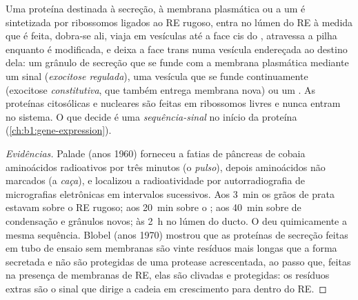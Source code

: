 \begin{proposition}\label{prop:b1:eukaryotic-cell:secretory}
Uma proteína destinada à secreção, à membrana plasmática ou a um
 é sintetizada por ribossomos ligados ao RE rugoso, entra no
lúmen do RE à medida que é feita, dobra-se ali, viaja em vesículas até a
face cis do , atravessa a pilha enquanto é modificada, e deixa a
face trans numa vesícula endereçada ao destino dela: um grânulo de
secreção que se funde com a membrana plasmática mediante um sinal
(\emph{exocitose regulada}), uma vesícula que se funde
continuamente (exocitose \emph{constitutiva}, que também entrega
membrana nova) ou um . As proteínas citosólicas e nucleares são
feitas em ribossomos livres e nunca entram no sistema. O que decide é
uma \emph{sequência-sinal} no início da proteína
(\cref{ch:b1:gene-expression}).
\end{proposition}
\begin{proof}[Evidências]
Palade (anos 1960) forneceu a fatias de pâncreas de cobaia aminoácidos
radioativos por três minutos (o \emph{pulso}), depois aminoácidos não
marcados (a \emph{caça}), e localizou a radioatividade por
autorradiografia de micrografias eletrônicas em intervalos sucessivos.
Aos \qty{3}{min} os grãos de prata estavam sobre o RE rugoso; aos
\qty{20}{min} sobre o ; aos \qty{40}{min} sobre  de
condensação e grânulos novos; às \qty{2}{h} no lúmen do ducto. O
 deu quimicamente a mesma sequência. Blobel (anos
1970) mostrou que as proteínas de secreção feitas em tubo de ensaio sem
membranas são vinte resíduos mais longas que a forma secretada e não são
protegidas de uma protease acrescentada, ao passo que, feitas na
presença de membranas de RE, elas são clivadas e protegidas: os
resíduos extras são o sinal que dirige a cadeia em crescimento para
dentro do RE.
\end{proof}

